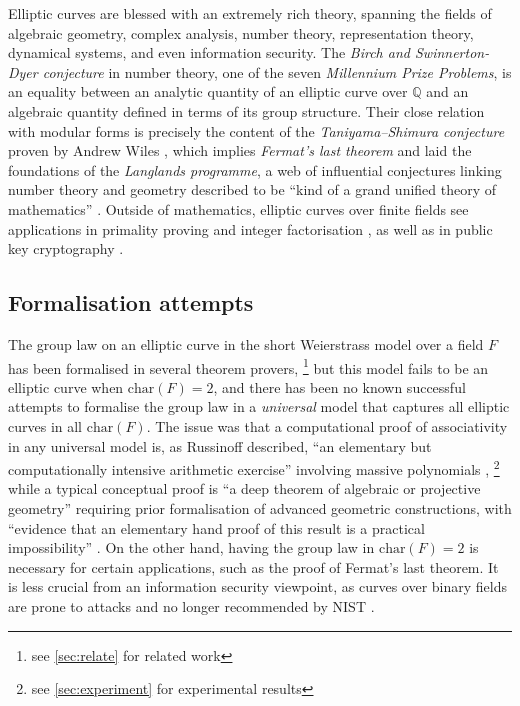 \documentclass[a4paper,UKenglish,cleveref,autoref,thm-restate]{lipics-v2021}
\begin{document}
\pagebreak

Elliptic curves are blessed with an extremely rich theory, spanning the fields of algebraic geometry, complex analysis, number theory, representation theory, dynamical systems, and even information security. The \emph{Birch and Swinnerton-Dyer conjecture} \cite{bsd} in number theory, one of the seven \emph{Millennium Prize Problems}, is an equality between an analytic quantity of an elliptic curve over $ \mathbb{Q} $ and an algebraic quantity defined in terms of its group structure. Their close relation with modular forms is precisely the content of the \emph{Taniyama--Shimura conjecture} proven by Andrew Wiles \cite{wiles}, which implies \emph{Fermat's last theorem} and laid the foundations of the \emph{Langlands programme}, a web of influential conjectures linking number theory and geometry described to be ``kind of a grand unified theory of mathematics'' \cite{langlands}. Outside of mathematics, elliptic curves over finite fields see applications in primality proving \cite{atkin} and integer factorisation \cite{lenstra}, as well as in public key cryptography \cite{ecdh}.

\subsection{Formalisation attempts}

The group law on an elliptic curve in the short Weierstrass model over a field $ F $ has been formalised in several theorem provers, \footnote{see \cref{sec:relate} for related work} but this model fails to be an elliptic curve when $ \mathrm{char}(F) = 2 $, and there has been no known successful attempts to formalise the group law in a \emph{universal} model that captures all elliptic curves in all $ \mathrm{char}(F) $. The issue was that a computational proof of associativity in any universal model is, as Russinoff described, ``an elementary but computationally intensive arithmetic exercise'' involving massive polynomials \cite{sutherland}, \footnote{see \cref{sec:experiment} for experimental results} while a typical conceptual proof is ``a deep theorem of algebraic or projective geometry'' requiring prior formalisation of advanced geometric constructions, with ``evidence that an elementary hand proof of this result is a practical impossibility'' \cite{russinoff}. On the other hand, having the group law in $ \mathrm{char}(F) = 2 $ is necessary for certain applications, such as the proof of Fermat's last theorem. It is less crucial from an information security viewpoint, as curves over binary fields are prone to attacks and no longer recommended by NIST \cite{nist}.
\end{document}
